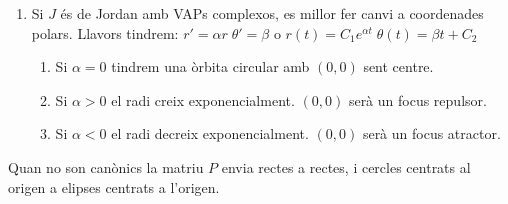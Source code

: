 \documentclass[../main.tex]{subfiles}
\begin{document}
\begin{enumerate}
	\item Si $J$ és de Jordan amb VAPs complexos, es millor fer canvi a coordenades polars. Llavors tindrem: $r' = \alpha r\;\theta' = \beta$ o $r(t) = C_1e^{\alpha t}\;\theta(t) = \beta t + C_2$
	\begin{enumerate}
		\item Si $\alpha = 0$ tindrem una òrbita circular amb $(0,0)$ sent centre.
		\item Si $\alpha > 0$ el radi creix exponencialment. $(0,0)$ serà un focus repulsor.
		\item Si $\alpha < 0$ el radi decreix exponencialment. $(0,0)$ serà un focus atractor.
	\end{enumerate}
\end{enumerate}
Quan no son canònics la matriu $P$ envia rectes a rectes, i cercles centrats al origen a elipses centrats a l'origen.
\end{document}
